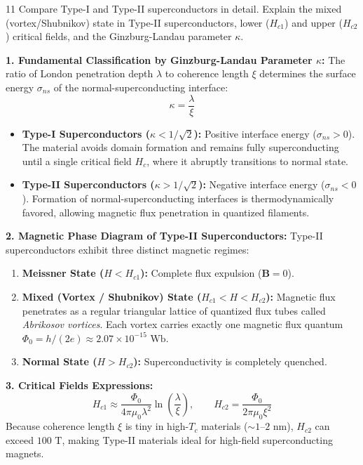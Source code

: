 \begin{theoryq}{11}
Compare Type-I and Type-II superconductors in detail. Explain the mixed (vortex/Shubnikov) state in Type-II superconductors, lower ($H_{c1}$) and upper ($H_{c2}$) critical fields, and the Ginzburg-Landau parameter $\kappa$.
\end{theoryq}
\begin{theorysol}
\textbf{1. Fundamental Classification by Ginzburg-Landau Parameter $\kappa$:}
The ratio of London penetration depth $\lambda$ to coherence length $\xi$ determines the surface energy $\sigma_{ns}$ of the normal-superconducting interface:
\begin{equation}
\kappa = \frac{\lambda}{\xi}
\end{equation}
\begin{itemize}
\item \textbf{Type-I Superconductors ($\kappa < 1/\sqrt{2}$):} Positive interface energy ($\sigma_{ns} > 0$). The material avoids domain formation and remains fully superconducting until a single critical field $H_c$, where it abruptly transitions to normal state.
\item \textbf{Type-II Superconductors ($\kappa > 1/\sqrt{2}$):} Negative interface energy ($\sigma_{ns} < 0$). Formation of normal-superconducting interfaces is thermodynamically favored, allowing magnetic flux penetration in quantized filaments.
\end{itemize}

\textbf{2. Magnetic Phase Diagram of Type-II Superconductors:}
Type-II superconductors exhibit three distinct magnetic regimes:
\begin{enumerate}
\item \textbf{Meissner State ($H < H_{c1}$):} Complete flux expulsion ($\mathbf{B}=0$).
\item \textbf{Mixed (Vortex / Shubnikov) State ($H_{c1} < H < H_{c2}$):} Magnetic flux penetrates as a regular triangular lattice of quantized flux tubes called \textit{Abrikosov vortices}. Each vortex carries exactly one magnetic flux quantum $\Phi_0 = h/(2e) \approx 2.07 \times 10^{-15}\text{ Wb}$.
\item \textbf{Normal State ($H > H_{c2}$):} Superconductivity is completely quenched.
\end{enumerate}

\textbf{3. Critical Fields Expressions:}
\begin{equation}
H_{c1} \approx \frac{\Phi_0}{4\pi \mu_0 \lambda^2} \ln\left(\frac{\lambda}{\xi}\right),\qquad H_{c2} = \frac{\Phi_0}{2\pi \mu_0 \xi^2}
\end{equation}
Because coherence length $\xi$ is tiny in high-$T_c$ materials ($\sim 1\text{--}2\text{ nm}$), $H_{c2}$ can exceed $100\text{ T}$, making Type-II materials ideal for high-field superconducting magnets.
\end{theorysol}
\vspace{4mm}

